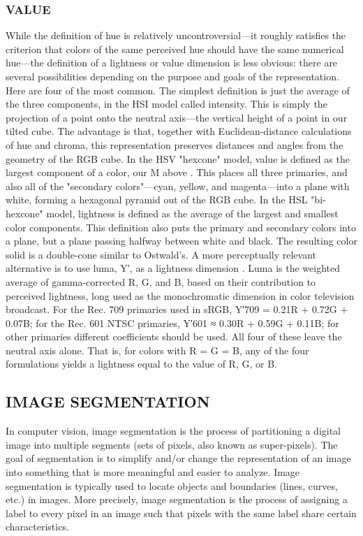 \subsubsection{VALUE}
While the definition of hue is relatively uncontroversial—it roughly satisfies the criterion that colors of the same perceived hue should have the same numerical hue—the definition of a lightness or value dimension is less obvious: there are several possibilities depending on the purpose and goals of the representation. Here are four of the most common. 
The simplest definition is just the average of the three components, in the HSI model called intensity. This is simply the projection of a point onto the neutral axis—the vertical height of a point in our tilted cube. The advantage is that, together with Euclidean-distance calculations of hue and chroma, this representation preserves distances and angles from the geometry of the RGB cube.
In the HSV "hexcone" model, value is defined as the largest component of a color, our M above . This places all three primaries, and also all of the "secondary colors"—cyan, yellow, and magenta—into a plane with white, forming a hexagonal pyramid out of the RGB cube.
In the HSL "bi-hexcone" model, lightness is defined as the average of the largest and smallest color components. This definition also puts the primary and secondary colors into a plane, but a plane passing halfway between white and black. The resulting color solid is a double-cone similar to Ostwald’s.
A more perceptually relevant alternative is to use luma, Y′, as a lightness dimension . Luma is the weighted average of gamma-corrected R, G, and B, based on their contribution to perceived lightness, long used as the monochromatic dimension in color television broadcast. For the Rec. 709 primaries used in sRGB, Y′709 = 0.21R + 0.72G + 0.07B; for the Rec. 601 NTSC primaries, Y′601 ≈ 0.30R + 0.59G + 0.11B; for other primaries different coefficients should be used.
All four of these leave the neutral axis alone. That is, for colors with R = G = B, any of the four formulations yields a lightness equal to the value of R, G, or B.

\subsection{IMAGE SEGMENTATION}
In computer vision, image segmentation is the process of partitioning a digital image into multiple segments (sets of pixels, also known as super-pixels). The goal of segmentation is to simplify and/or change the representation of an image into something that is more meaningful and easier to analyze. Image segmentation is typically used to locate objects and boundaries (lines, curves, etc.) in images. More precisely, image segmentation is the process of assigning a label to every pixel in an image such that pixels with the same label share certain characteristics.


